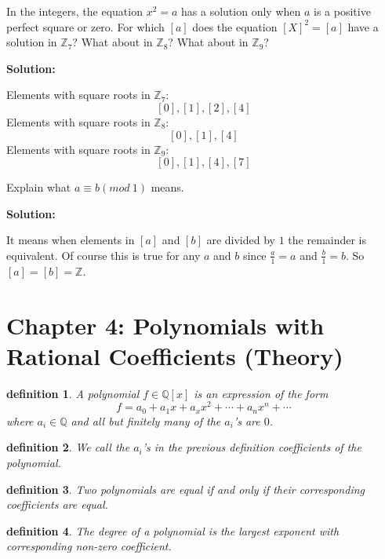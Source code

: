 \documentclass[8pt]{article}
\newtheorem{definition}{definition}
\begin{document}
\begin{tcolorbox}[title=Problem 13, breakable]
    In the integers, the equation $x^2 = a$ has a solution only when $a$
    is a positive perfect square or zero. For which $[a]$ does the equation 
    $[X]^2 = [a]$ have a solution in $\mathbb{Z}_7$?
    What about in $\mathbb{Z}_8$?
    What about in $\mathbb{Z}_9$?
\end{tcolorbox}

\textbf{Solution:}

Elements with square roots in $\mathbb{Z}_7$: 
\[[0], [1], [2], [4]\]
Elements with square roots in $\mathbb{Z}_8$: 
\[[0], [1], [4]\]
Elements with square roots in $\mathbb{Z}_9$: 
\[[0], [1], [4], [7]\]

\begin{tcolorbox}[title=Problem 14, breakable]
    Explain what $a \equiv b (mod\ 1)$ means.
\end{tcolorbox}

\textbf{Solution:}

It means when elements in $[a]$ and $[b]$ are divided by $1$ the remainder is equivalent.
Of course this is true for any $a$ and $b$ since $\frac{a}{1} = a$ and $\frac{b}{1} = b$.
So $[a] = [b] = \mathbb{Z}$.

\section{Chapter 4: Polynomials with Rational Coefficients (Theory)}

\begin{definition}
    A polynomial $f \in \mathbb{Q}[x]$ is an expression of the form
    \[f = a_0 + a_1 x + a_x x^2 + \cdots + a_n x^n + \cdots\]
    where $a_i \in \mathbb{Q}$ and all but finitely many of the $a_i$'s are $0$.
\end{definition}

\begin{definition}
    We call the $a_i$'s in the previous definition coefficients of the polynomial.
\end{definition}

\begin{definition}
    Two polynomials are equal if and only if their corresponding coefficients are equal.
\end{definition}

\begin{definition}
    The degree of a polynomial is the largest exponent with corresponding non-zero coefficient.
\end{definition}
\end{document}
